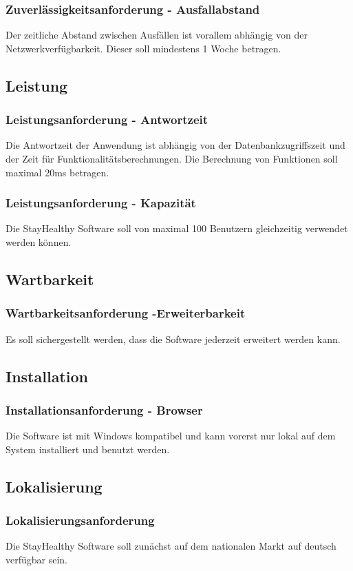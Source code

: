 \documentclass[12pt,a4paper,onecolumn]{article}
\begin{document}
\subsubsection{Zuverlässigkeitsanforderung - Ausfallabstand}
Der zeitliche Abstand zwischen Ausfällen ist vorallem abhängig von der Netzwerkverfügbarkeit. Dieser soll mindestens 1 Woche betragen.
\subsection{Leistung}
\subsubsection{Leistungsanforderung - Antwortzeit}
Die Antwortzeit der Anwendung ist abhängig von der Datenbankzugriffszeit und der Zeit für Funktionalitätsberechnungen.
Die Berechnung von Funktionen soll maximal 20ms betragen.
\subsubsection{Leistungsanforderung - Kapazität}
Die StayHealthy Software soll von maximal 100 Benutzern gleichzeitig verwendet werden können.
\subsection{Wartbarkeit}
\subsubsection{Wartbarkeitsanforderung -Erweiterbarkeit}
Es soll sichergestellt werden, dass die Software jederzeit erweitert werden kann.
\subsection{Installation}
\subsubsection{Installationsanforderung - Browser}
Die Software ist mit Windows kompatibel und kann vorerst nur lokal auf dem System installiert und benutzt werden.
\subsection{Lokalisierung}
\subsubsection{Lokalisierungsanforderung}
Die StayHealthy Software soll zunächst auf dem nationalen Markt auf deutsch verfügbar sein.
\end{document}
